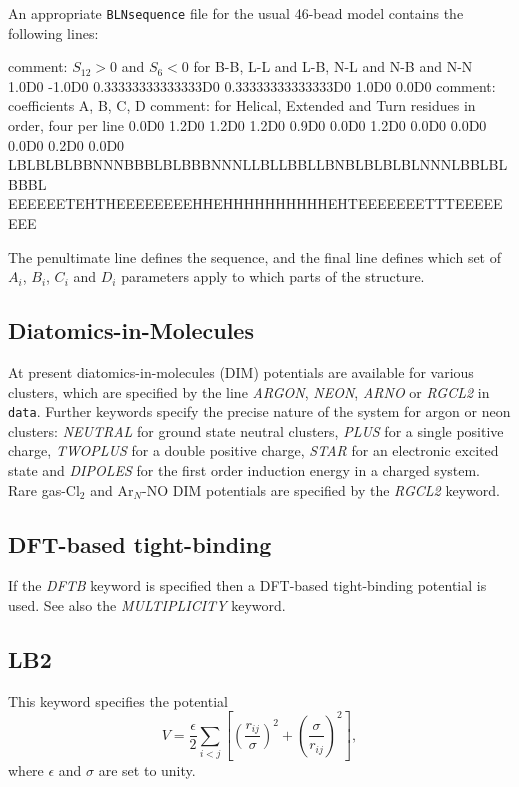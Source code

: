 \documentclass[12pt,a4paper,dvips]{article}
\begin{document}
An appropriate {\tt BLNsequence} file for the usual 46-bead model contains the following
lines:

{\obeylines
\noindent comment: $S_{12}>0$ and $S_6<0$ for B-B, L-L and L-B, N-L and N-B and N-N
\noindent 1.0D0 -1.0D0
\noindent 0.33333333333333D0 0.33333333333333D0
\noindent 1.0D0 0.0D0
\noindent comment: coefficients A, B, C, D
\noindent comment: for Helical, Extended and Turn residues in order, four per line
\noindent 0.0D0 1.2D0 1.2D0 1.2D0
\noindent 0.9D0 0.0D0 1.2D0 0.0D0
\noindent 0.0D0 0.0D0 0.2D0 0.0D0
\noindent LBLBLBLBBNNNBBBLBLBBBNNNLLBLLBBLLBNBLBLBLBLNNNLBBLBLBBBL
\noindent EEEEEETEHTHEEEEEEEEHHEHHHHHHHHHHEHTEEEEEEETTTEEEEEEEE
}

\noindent The penultimate line defines the sequence, and the final line
defines which set of $A_i$, $B_i$, $C_i$ and $D_i$ parameters apply to which 
parts of the structure.\cite{BrownFH03}


\subsection{Diatomics-in-Molecules}

At present diatomics-in-molecules (DIM) potentials are available for various
clusters, which are specified by the line {\it ARGON\/}, {\it NEON\/},
{\it ARNO} or {\it RGCL2\/} in {\tt data}.
Further keywords specify the precise nature of the system for argon or
neon clusters: {\it NEUTRAL\/} for ground state neutral
clusters, {\it PLUS\/} for a single positive charge, {\it TWOPLUS\/} for a double positive
charge, {\it STAR\/} for an electronic excited state and {\it DIPOLES\/} for the first order
induction energy in a charged system. Rare gas-Cl$_2$ and Ar$_N$-NO DIM potentials
are specified by the {\it RGCL2\/} keyword.

\subsection{DFT-based tight-binding}

If the {\it DFTB\/} keyword is specified then a DFT-based tight-binding potential
is used. See also the {\it MULTIPLICITY\/} keyword.

\subsection{LB2}

This keyword specifies the potential\cite{LB299a,LB299b,LB204}
\begin{equation}
V = \frac{\epsilon}{2} \sum_{i<j} \left[ \left(\frac{r_{ij}}{\sigma}\right)^2+
\left(\frac{\sigma}{r_{ij}}\right)^2\right],
\end{equation}
where $\epsilon$ and $\sigma$ are set to unity.
\end{document}
